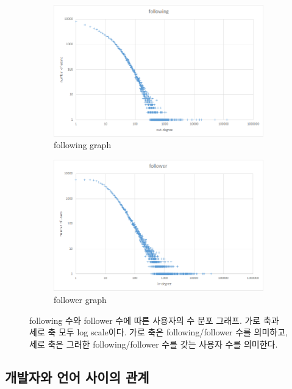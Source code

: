 \documentclass[10pt, a4paper, titlepage]{article}
\begin{document}
\begin{figure}
	\begin{subfigure}{0.99\textwidth}
		\includegraphics[width=\textwidth]{image09}
		\caption{following graph}
	\end{subfigure}

	\begin{subfigure}{0.99\textwidth}
		\includegraphics[width=\textwidth]{image13}
		\caption{follower graph}
	\end{subfigure}

	\caption{following 수와 follower 수에 따른 사용자의 수 분포 그래프. 가로 축과 세로 축 모두 log scale이다. 가로 축은 following/follower 수를 의미하고, 세로 축은 그러한 following/follower 수를 갖는 사용자 수를 의미한다.}
	\label{fig:fdist}
\end{figure}


\subsection{개발자와 언어 사이의 관계}
\end{document}
